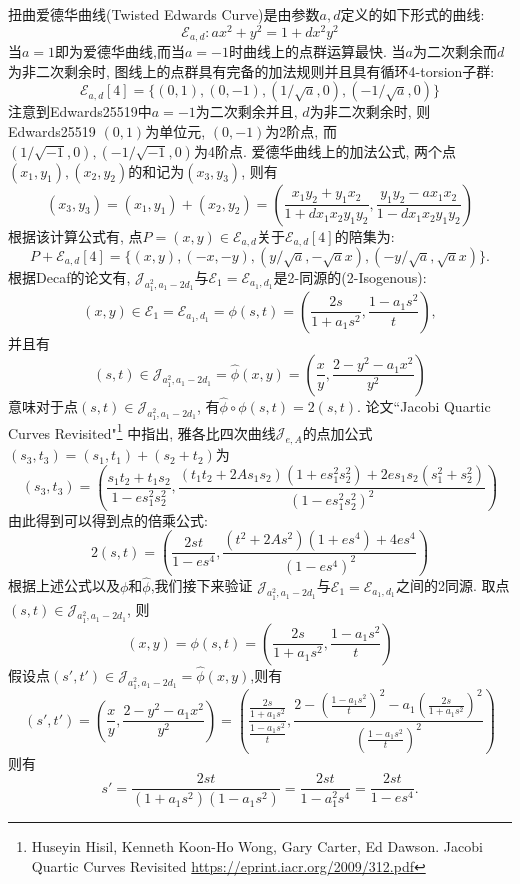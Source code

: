 \documentclass{article}
\newcommand{\E}{\mathcal{E}}
\newcommand{\J}{\mathcal{J}}
\begin{document}
扭曲爱德华曲线(Twisted Edwards Curve)是由参数$a, d$定义的如下形式的曲线:
$$
\E_{a,d}: ax^2 + y^2 = 1 + dx^2y^2
$$
当$a=1$即为爱德华曲线,而当$a = -1$时曲线上的点群运算最快.
当$a$为二次剩余而$d$为非二次剩余时, 图线上的点群具有完备的加法规则并且具有循环4-torsion子群:
$$
\E_{a,d}[4] = \{(0,1), (0,-1), (1/\sqrt{a}, 0), (-1/\sqrt{a}, 0)\}
$$
注意到Edwards25519中$a = -1$为二次剩余并且, $d$为非二次剩余时,
则Edwards25519
$(0,1)$为单位元, $(0, -1)$为2阶点, 而$(1/\sqrt{-1},0), (-1/\sqrt{-1},0)$为4阶点.
爱德华曲线上的加法公式, 两个点$(x_1, y_1), (x_2, y_2)$的和记为$(x_3, y_3)$, 则有
$$
(x_3, y_3) = (x_1, y_1) + (x_2, y_2) = \left( \frac{x_1y_2 + y_1x_2}{1 + dx_1x_2y_1y_2}, \frac{y_1y_2 - ax_1x_2}{1-dx_1x_2y_1y_2} \right)
$$
根据该计算公式有, 点$P=(x,y)\in\E_{a,d}$关于$\E_{a,d}[4]$的陪集为:
$$
P + \E_{a,d}[4] = \{ (x,y), (-x,-y), (y/\sqrt{a}, -\sqrt{a}x), (-y/\sqrt{a}, \sqrt{a}x) \}.
$$
根据Decaf的论文有, $\J_{a_1^2, a_1-2d_1}$与$\E_1 = \E_{a_1, d_1}$是2-同源的(2-Isogenous):
$$
(x,y) \in \E_1 = \E_{a_1, d_1} = \phi(s,t)  = \left( \frac{2s}{1 + a_1s^2}, \frac{1-a_1s^2}{t}\right), 
$$
并且有
$$
(s,t) \in \J_{a_1^2, a_1-2d_1} = \hat{\phi}(x,y) = \left( \frac{x}{y}, \frac{2-y^2 - a_1x^2}{y^2}\right)
$$
意味对于点$(s,t)\in \J_{a_1^2, a_1-2d_1}$, 有$\hat{\phi}\circ\phi(s,t) = 2(s,t).$
论文``Jacobi Quartic Curves Revisited"\footnote{
Huseyin Hisil, Kenneth Koon-Ho Wong, Gary Carter, Ed Dawson. 
Jacobi Quartic Curves Revisited
\url{https://eprint.iacr.org/2009/312.pdf}}
中指出, 雅各比四次曲线$\J_{e, A}$的点加公式$(s_3, t_3) = (s_1, t_1) + (s_2 + t_2)$为
$$
(s_3, t_3) = \left(
\frac{s_1t_2 + t_1s_2}{1 - es_1^2s_2^2},
\frac{(t_1t_2 + 2As_1s_2)(1 + es_1^2s_2^2) + 2es_1s_2(s_1^2+s_2^2)}{\left(1 - es_1^2s_2^2\right)^2}
\right)
$$
由此得到可以得到点的倍乘公式:
\begin{equation}\label{eq-jacobi-double}
2(s,t) = \left(
\frac{2st}{1 - es^4},
\frac{(t^2 + 2As^2)(1 + es^4) + 4es^4}{\left(1 - es^4\right)^2}
\right)
\end{equation}
根据上述公式以及$\phi$和$\hat{\phi}$,我们接下来验证
$\J_{a_1^2, a_1-2d_1}$与$\E_1 = \E_{a_1, d_1}$之间的2同源.
取点$(s,t) \in \J_{a_1^2, a_1-2d_1}$, 则
$$
(x,y) = \phi(s,t)  = \left( \frac{2s}{1 + a_1s^2}, \frac{1-a_1s^2}{t}\right)
$$
假设点$(s',t')\in \J_{a_1^2, a_1-2d_1} = \hat{\phi}(x,y)$,则有
$$
(s',t') = \left(
\frac{x}{y}, 
\frac{2-y^2 - a_1x^2}{y^2}
\right) = \left(
\frac{\frac{2s}{1 + a_1s^2}}{\frac{1-a_1s^2}{t}},
\frac{2-\left(\frac{1-a_1s^2}{t}\right)^2 - a_1\left(\frac{2s}{1 + a_1s^2}\right)^2}{\left(\frac{1-a_1s^2}{t}\right)^2}
\right)
$$
则有
\begin{equation}\label{eq-s}
s' = \frac{2st}{(1+a_1s^2)(1-a_1s^2)} = \frac{2st}{1-a_1^2s^4} = \frac{2st}{1-es^4}.
\end{equation}
\end{document}
